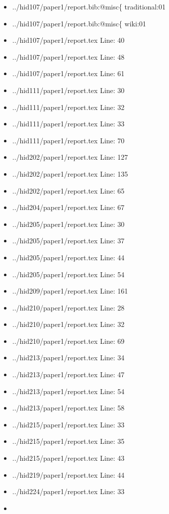 \begin{itemize}
\item
  ../hid107/paper1/report.bib:@misc\{ traditional:01
\item
  ../hid107/paper1/report.bib:@misc\{ wiki:01
\item
  ../hid107/paper1/report.tex Line: 40
\item
  ../hid107/paper1/report.tex Line: 48
\item
  ../hid107/paper1/report.tex Line: 61
\item
  ../hid111/paper1/report.tex Line: 30
\item
  ../hid111/paper1/report.tex Line: 32
\item
  ../hid111/paper1/report.tex Line: 33
\item
  ../hid111/paper1/report.tex Line: 70
\item
  ../hid202/paper1/report.tex Line: 127
\item
  ../hid202/paper1/report.tex Line: 135
\item
  ../hid202/paper1/report.tex Line: 65
\item
  ../hid204/paper1/report.tex Line: 67
\item
  ../hid205/paper1/report.tex Line: 30
\item
  ../hid205/paper1/report.tex Line: 37
\item
  ../hid205/paper1/report.tex Line: 44
\item
  ../hid205/paper1/report.tex Line: 54
\item
  ../hid209/paper1/report.tex Line: 161
\item
  ../hid210/paper1/report.tex Line: 28
\item
  ../hid210/paper1/report.tex Line: 32
\item
  ../hid210/paper1/report.tex Line: 69
\item
  ../hid213/paper1/report.tex Line: 34
\item
  ../hid213/paper1/report.tex Line: 47
\item
  ../hid213/paper1/report.tex Line: 54
\item
  ../hid213/paper1/report.tex Line: 58
\item
  ../hid215/paper1/report.tex Line: 33
\item
  ../hid215/paper1/report.tex Line: 35
\item
  ../hid215/paper1/report.tex Line: 43
\item
  ../hid219/paper1/report.tex Line: 44
\item
  ../hid224/paper1/report.tex Line: 33
\item

\end{itemize}
